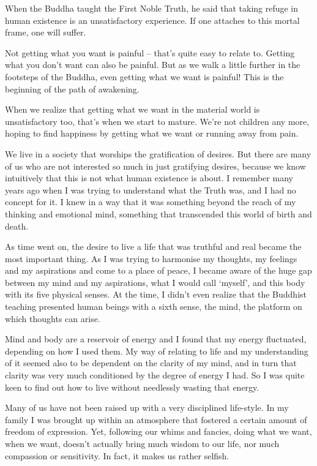 

When the Buddha taught the First Noble Truth, he said that taking refuge in human existence is an unsatisfactory experience. If one attaches to this mortal frame, one will suffer.

Not getting what you want is painful -- that's quite easy to relate to. Getting what you don't want can also be painful. But as we walk a little further in the footsteps of the Buddha, even getting what we want is painful! This is the beginning of the path of awakening.

When we realize that getting what we want in the material world is unsatisfactory too, that's when we start to mature. We're not children any more, hoping to find happiness by getting what we want or running away from pain.

We live in a society that worships the gratification of desires. But there are many of us who are not interested so much in just gratifying desires, because we know intuitively that this is not what human existence is about. I remember many years ago when I was trying to understand what the Truth was, and I had no concept for it. I knew in a way that it was something beyond the reach of my thinking and emotional mind, something that transcended this world of birth and death.

As time went on, the desire to live a life that was truthful and real became the most important thing. As I was trying to harmonise my thoughts, my feelings and my aspirations and come to a place of peace, I became aware of the huge gap between my mind and my aspirations, what I would call `myself', and this body with its five physical senses. At the time, I didn't even realize that the Buddhist teaching presented human beings with a sixth sense, the mind, the platform on which thoughts can arise.

Mind and body are a reservoir of energy and I found that my energy fluctuated, depending on how I used them. My way of relating to life and my understanding of it seemed also to be dependent on the clarity of my mind, and in turn that clarity was very much conditioned by the degree of energy I had. So I was quite keen to find out how to live without needlessly wasting that energy.

Many of us have not been raised up with a very disciplined life-style. In my family I was brought up within an atmosphere that fostered a certain amount of freedom of expression. Yet, following our whims and fancies, doing what we want, when we want, doesn't actually bring much wisdom to our life, nor much compassion or sensitivity. In fact, it makes us rather selfish.

